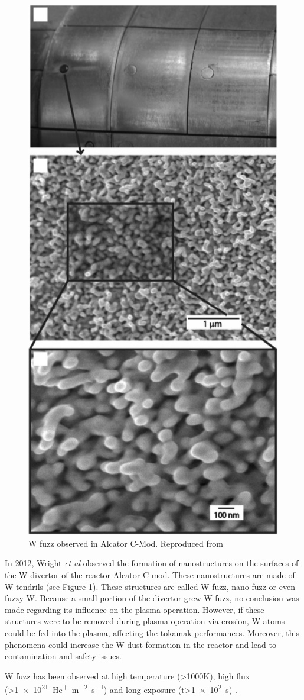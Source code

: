 \begin{figure} [h!]
    \centering
    \includegraphics[width=0.5\linewidth]{Figures/Chapter1/fuzz_alcator_wright.jpg}
    \caption{W fuzz observed in Alcator C-Mod. Reproduced from \cite{wright_tungsten_2012}}
    \label{fig: w fuzz wright}
\end{figure}

In 2012, Wright \textit{et al}  observed the formation of nanostructures on the surfaces of the W divertor of the reactor Alcator C-mod.
These nanostructures are made of W tendrils (see Figure \ref{fig: w fuzz wright}).
These structures are called W fuzz, nano-fuzz or even fuzzy W.
Because a small portion of the divertor grew W fuzz, no conclusion was made regarding its influence on the plasma operation.
However, if these structures were to be removed during plasma operation via erosion, W atoms could be fed into the plasma, affecting the tokamak performances.
Moreover, this phenomena could increase the W dust formation in the reactor and lead to contamination and safety issues.

W fuzz has been observed at high temperature (>1000K), high flux (>\SI{1e21}{He^+.m^{-2}.s^{-1}}) and long exposure (t>\SI{1e2}{s}) .

